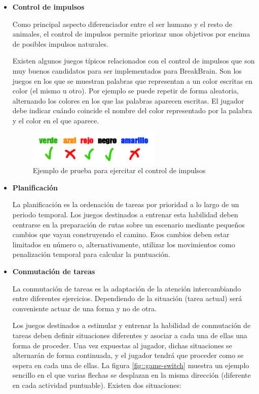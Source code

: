 \begin{itemize}

\item {\bf Control de impulsos}

Como principal aspecto diferenciador entre el ser humano y el resto de animales, el control de impulsos permite priorizar unos objetivos por encima de posibles impulsos naturales.

Existen algunos juegos típicos relacionados con el control de impulsos que son muy buenos candidatos para ser implementados para BreakBrain. Son los juegos en los que se muestran palabras que representan a un color escritas en color (el mismo u otro). Por ejemplo se puede repetir de forma aleatoria, alternando los colores en los que las palabras aparecen escritas. El jugador debe indicar cuándo coincide el nombre del color representado por la palabra y el color en el que aparece.

\begin{figure}[h]
  \begin{center}
    \includegraphics[width=0.6\textwidth]{./images/game-impulse.png}
    \caption{Ejemplo de prueba para ejercitar el control de impulsos}
  \end{center}  
\end{figure}

\item {\bf Planificación}

La planificación es la ordenación de tareas por prioridad a lo largo de un periodo temporal. Los juegos destinados a entrenar esta habilidad deben centrarse en la preparación de rutas sobre un escenario mediante pequeños cambios que vayan construyendo el camino. Esos cambios deben estar limitados en número o, alternativamente, utilizar los movimientos como penalización temporal para calcular la puntuación.

\item {\bf Conmutación de tareas}

La conmutación de tareas es la adaptación de la atención intercambiando entre diferentes ejercicios. Dependiendo de la situación (tarea actual) será conveniente actuar de una forma y no de otra.

Los juegos destinados a estimular y entrenar la habilidad de conmutación de tareas deben definir situaciones diferentes y asociar a cada una de ellas una forma de proceder. Una vez expuestas al jugador, dichas situaciones se alternarán de forma continuada, y el jugador tendrá que proceder como se espera en cada una de ellas. La figura \ref{fig::game-switch} muestra un ejemplo sencillo en el que varias flechas se desplazan en la misma dirección (diferente en cada actividad puntuable). Existen dos situaciones:


\end{itemize}
